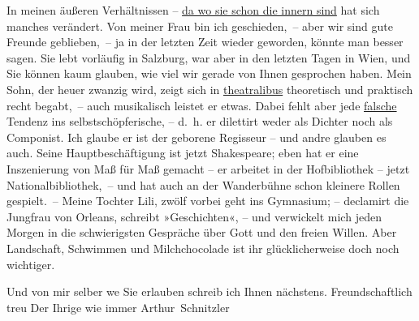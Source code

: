 \pstart
           In meinen äußeren Verhältnissen – \uline{da wo sie schon die
                  innern sind} hat sich manches verändert. Von meiner Frau bin ich geschieden, – aber wir sind
               gute Freunde geblieben, – ja in der letzten Zeit wieder geworden, könnte man besser
               sagen. Sie lebt vorläufig in Salzburg, war aber in
               den letzten Tagen in Wien, und Sie können kaum
               glauben, wie viel wir gerade von Ihnen gesprochen haben. Mein Sohn, der {\pb}heuer zwanzig wird, zeigt sich in \uline{theatralibus} theoretisch und praktisch recht begabt, – auch
               musikalisch leistet er etwas. Dabei fehlt aber jede \uline{falsche} Tendenz ins selbstschöpferische, – d. h. er dilettirt weder als
               Dichter noch als Componist. Ich glaube er ist der geborene Regisseur – und andre
               glauben es auch. Seine Hauptbeschäftigung ist jetzt Shakespeare; eben hat er eine Inszenierung von Maß für Maß gemacht – er arbeitet in der Hofbibliothek – jetzt Nationalbibliothek, – und hat auch an der Wanderbühne schon kleinere Rollen gespielt. – Meine Tochter Lili, zwölf vorbei geht ins Gymnasium; –
               declamirt die Jungfrau von Orleans, schreibt
               »Geschichten«, – und verwickelt mich jeden Morgen in die schwierigsten Gespräche über
               Gott und \introOben{}den\introOben{} freien Willen. Aber Landschaft, Schwimmen und
               Milchchocolade ist ihr glücklicherweise doch noch wichtiger.\pend
           
\pstart
           Und von mir selber we{\geminationn} Sie erlauben schreib ich Ihnen
               nächstens. Freundschaftlich treu\pend
           \pstart Der Ihrige wie immer \spacefill\mbox{Arthur Schnitzler}\pend{}\endnumbering{}  
      